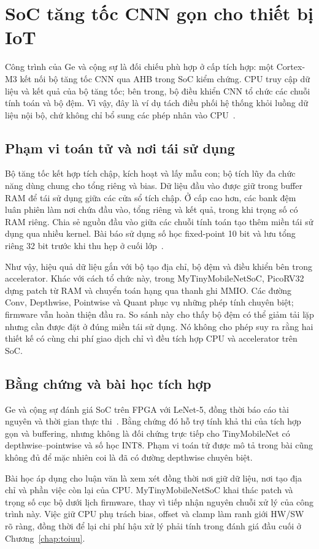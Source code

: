 \section{SoC tăng tốc CNN gọn cho thiết bị IoT}
Công trình của Ge và cộng sự là đối chiếu phù hợp ở cấp tích hợp: một Cortex-M3 kết nối bộ tăng tốc CNN qua AHB trong SoC kiểm chứng. CPU truy cập dữ liệu và kết quả của bộ tăng tốc; bên trong, bộ điều khiển CNN tổ chức các chuỗi tính toán và bộ đệm. Vì vậy, đây là ví dụ tách điều phối hệ thống khỏi luồng dữ liệu nội bộ, chứ không chỉ bổ sung các phép nhân vào CPU~\cite[Sections~3.2, 4.1]{ge2019compact}.

\subsection{Phạm vi toán tử và nơi tái sử dụng}
Bộ tăng tốc kết hợp tích chập, kích hoạt và lấy mẫu con; bộ tích lũy đa chức năng dùng chung cho tổng riêng và bias. Dữ liệu đầu vào được giữ trong buffer RAM để tái sử dụng giữa các cửa sổ tích chập. Ở cấp cao hơn, các bank đệm luân phiên làm nơi chứa đầu vào, tổng riêng và kết quả, trong khi trọng số có RAM riêng. Chia sẻ nguồn đầu vào giữa các chuỗi tính toán tạo thêm miền tái sử dụng qua nhiều kernel. Bài báo sử dụng số học fixed-point 10 bit và lưu tổng riêng 32 bit trước khi thu hẹp ở cuối lớp~\cite[Sections~2--3]{ge2019compact}.

Như vậy, hiệu quả dữ liệu gắn với bộ tạo địa chỉ, bộ đệm và điều khiển bên trong accelerator. Khác với cách tổ chức này, trong MyTinyMobileNetSoC, PicoRV32 dựng patch từ RAM và chuyển toán hạng qua thanh ghi MMIO. Các đường Conv, Depthwise, Pointwise và Quant phục vụ những phép tính chuyên biệt; firmware vẫn hoàn thiện đầu ra. So sánh này cho thấy bộ đệm có thể giảm tải lặp nhưng cần được đặt ở đúng miền tái sử dụng. Nó không cho phép suy ra rằng hai thiết kế có cùng chi phí giao dịch chỉ vì đều tích hợp CPU và accelerator trên SoC.

\subsection{Bằng chứng và bài học tích hợp}
Ge và cộng sự đánh giá SoC trên FPGA với LeNet-5, đồng thời báo cáo tài nguyên và thời gian thực thi~\cite[Section~4, Tables~3--5]{ge2019compact}. Bằng chứng đó hỗ trợ tính khả thi của tích hợp gọn và buffering, nhưng không là đối chứng trực tiếp cho TinyMobileNet có depthwise--pointwise và số học INT8. Phạm vi toán tử được mô tả trong bài cũng không đủ để mặc nhiên coi là đã có đường depthwise chuyên biệt.

Bài học áp dụng cho luận văn là xem xét đồng thời nơi giữ dữ liệu, nơi tạo địa chỉ và phần việc còn lại của CPU. MyTinyMobileNetSoC khai thác patch và trọng số cục bộ dưới lịch firmware, thay vì tiếp nhận nguyên chuỗi xử lý của công trình này. Việc giữ CPU phụ trách bias, offset và clamp làm ranh giới HW/SW rõ ràng, đồng thời để lại chi phí hậu xử lý phải tính trong đánh giá đầu cuối ở Chương~\ref{chap:toiuu}.

